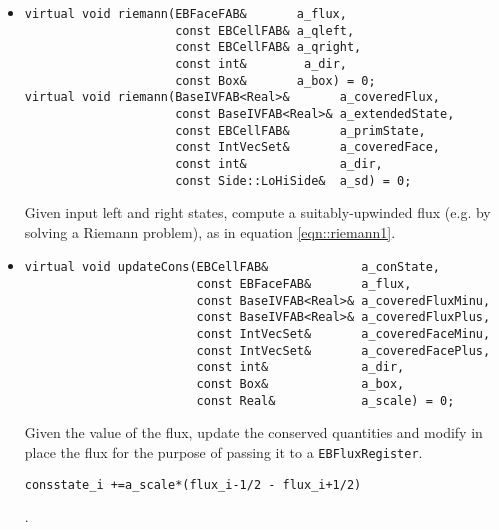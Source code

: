 \begin{itemize}
\item \begin{small}\begin{verbatim}
virtual void riemann(EBFaceFAB&       a_flux,
                     const EBCellFAB& a_qleft,
                     const EBCellFAB& a_qright,
                     const int&        a_dir,
                     const Box&       a_box) = 0;
virtual void riemann(BaseIVFAB<Real>&       a_coveredFlux,
                     const BaseIVFAB<Real>& a_extendedState,
                     const EBCellFAB&       a_primState,
                     const IntVecSet&       a_coveredFace,
                     const int&             a_dir,
                     const Side::LoHiSide&  a_sd) = 0;
\end{verbatim}\end{small}
Given input left and right states, compute a suitably-upwinded 
flux (e.g. by solving a Riemann problem), as in 
equation \ref{eqn::riemann1}.

\item \begin{small}\begin{verbatim}
virtual void updateCons(EBCellFAB&             a_conState,
                        const EBFaceFAB&       a_flux,
                        const BaseIVFAB<Real>& a_coveredFluxMinu,
                        const BaseIVFAB<Real>& a_coveredFluxPlus,
                        const IntVecSet&       a_coveredFaceMinu,
                        const IntVecSet&       a_coveredFacePlus,
                        const int&             a_dir,
                        const Box&             a_box,
                        const Real&            a_scale) = 0;
\end{verbatim}\end{small}
Given the value of the flux, update the conserved quantities and modify 
in place the flux for the purpose of passing it to a 
{\tt EBFluxRegister}. 
\begin{verbatim}consstate_i +=a_scale*(flux_i-1/2 - flux_i+1/2)\end{verbatim}. 



\end{itemize}
